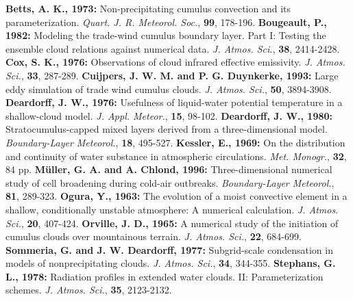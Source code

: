 \documentclass[11pt,a4paper]{scrartcl}
\newenvironment{bibliographie}[1]
{\begin{thebibliography}{0000}{}
\leftskip=5mm \setlength{\itemindent}{-5mm}#1} 
{\end{thebibliography}}
\begin{document}
\setlength{} 
\begin{bibliographie}{}
   \textbf{Betts, A. K., 1973:} Non-precipitating cumulus convection and its parameterization.
   \textit{Quart. J. R. Meteorol. Soc.}, \textbf{99}, 178-196.
   \textbf{Bougeault, P., 1982:} Modeling the trade-wind cumulus boundary layer. Part I: Testing the ensemble cloud relations 
   against numerical data. \textit{J. Atmos. Sci.}, \textbf{38}, 2414-2428.
   \textbf{Cox, S. K., 1976:} Observations of cloud infrared effective emissivity.
   \textit{J. Atmos. Sci.}, \textbf{33}, 287-289.
   \textbf{Cuijpers, J. W. M. and P. G. Duynkerke, 1993:} Large eddy simulation of trade wind cumulus clouds.
   \textit{J. Atmos. Sci.}, \textbf{50}, 3894-3908.
   \textbf{Deardorff, J. W., 1976:} Usefulness of liquid-water potential temperature in a shallow-cloud model. 
   \textit{J. Appl. Meteor.}, \textbf{15}, 98-102.
   \textbf{Deardorff, J. W., 1980:} Stratocumulus-capped mixed layers derived from a three-dimensional model. 
   \textit{Boundary-Layer Meteorol.}, \textbf{18}, 495-527.
   \textbf{Kessler, E., 1969:} On the distribution and continuity of water substance in atmospheric circulations. 
   \textit{Met. Monogr.}, \textbf{32}, 84 pp.
   \textbf{M\"{u}ller, G. A. and A. Chlond, 1996:} Three-dimensional numerical study of cell broadening during cold-air outbreaks. 
   \textit{Boundary-Layer Meteorol.}, \textbf{81}, 289-323.
   \textbf{Ogura, Y., 1963:} The evolution of a moist convective element in a shallow, conditionally unstable atmosphere: 
   A numerical calculation. \textit{J. Atmos. Sci.}, \textbf{20}, 407-424.
   \textbf{Orville, J. D., 1965:} A numerical study of the initiation of cumulus clouds over mountainous terrain. 
   \textit{J. Atmos. Sci.}, \textbf{22}, 684-699.
   \textbf{Sommeria, G. and J. W. Deardorff, 1977:} Subgrid-scale condensation in models of nonprecipitating clouds.
   \textit{J. Atmos. Sci.}, \textbf{34}, 344-355.
   \textbf{Stephans, G. L., 1978:} Radiation profiles in extended water clouds. II: Parameterization schemes. 
   \textit{J. Atmos. Sci.}, \textbf{35}, 2123-2132.
\end{bibliographie}
\end{document}
